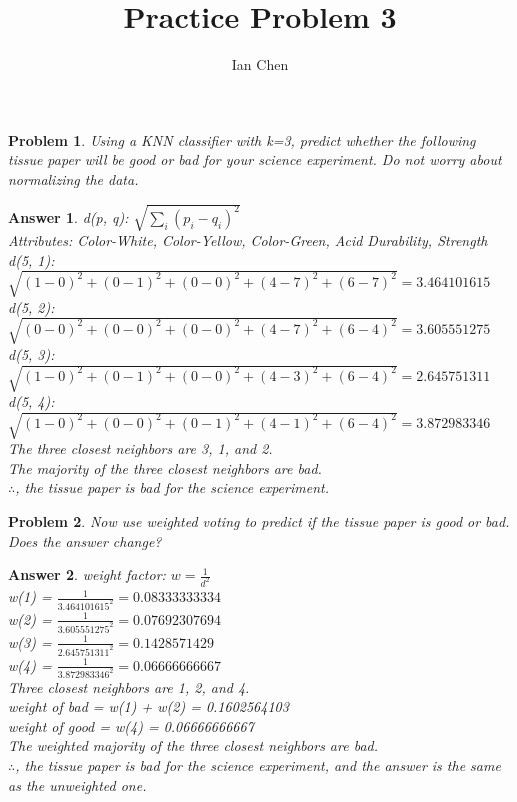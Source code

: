 \documentclass[11pt]{article}
\author{Ian Chen}
\title{Practice Problem 3}
\theoremstyle{description}
\newtheorem{problem}{Problem}
\theoremstyle{break}
\newtheorem*{answer}{Answer}
\begin{document}
    \maketitle

    \begin{problem}
        Using a KNN classifier with k=3, predict whether the following tissue paper will be good or bad for your science experiment.
        \textit{Do not worry about normalizing the data.}
    \end{problem}
    \begin{answer}
        d(p, q): $\sqrt{\sum_{i}(p_i - q_i)^2}$\\
        Attributes: Color-White, Color-Yellow, Color-Green, Acid Durability, Strength\\
        d(5, 1): $\sqrt{(1 - 0)^2 + (0 - 1)^2 + (0 - 0)^2 + (4 - 7)^2 + (6 - 7)^2} = 3.464101615$\\
        d(5, 2): $\sqrt{(0 - 0)^2 + (0 - 0)^2 + (0 - 0)^2 + (4 - 7)^2 + (6 - 4)^2} = 3.605551275$\\
        d(5, 3): $\sqrt{(1 - 0)^2 + (0 - 1)^2 + (0 - 0)^2 + (4 - 3)^2 + (6 - 4)^2} = 2.645751311$\\
        d(5, 4): $\sqrt{(1 - 0)^2 + (0 - 0)^2 + (0 - 1)^2 + (4 - 1)^2 + (6 - 4)^2} = 3.872983346$\\
        The three closest neighbors are 3, 1, and 2.\\
        The majority of the three closest neighbors are bad.\\
        $\therefore$, the tissue paper is bad for the science experiment.
    \end{answer}

    \begin{problem}
        Now use weighted voting to predict if the tissue paper is good or bad.
        Does the answer change?
    \end{problem}
    \begin{answer}
        weight factor: $w = \frac{1}{d^2}$\\
        w(1) = $\frac{1}{3.464101615^2} = 0.08333333334$\\
        w(2) = $\frac{1}{3.605551275^2} = 0.07692307694$\\
        w(3) = $\frac{1}{2.645751311^2} = 0.1428571429$\\
        w(4) = $\frac{1}{3.872983346^2} = 0.06666666667$\\
        Three closest neighbors are 1, 2, and 4.\\
        weight of bad = w(1) + w(2) = 0.1602564103\\
        weight of good = w(4) = 0.06666666667\\
        The weighted majority of the three closest neighbors are bad.\\
        $\therefore$, the tissue paper is bad for the science experiment, and the answer is the
        same as the unweighted one.
    \end{answer}
\end{document}
